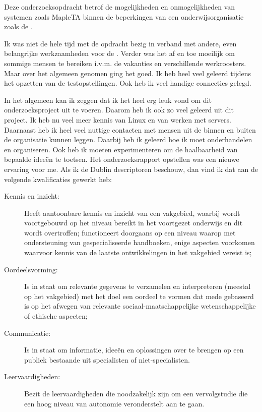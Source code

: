 
Deze onderzoeksopdracht betrof de mogelijkheden en onmogelijkheden van
systemen zoals MapleTA binnen de beperkingen van een
onderwijsorganisatie zoals de \HR{}.

Ik was niet de hele tijd met de opdracht bezig in verband met andere,
even belangrijke werkzaamheden voor de \HR{}. Verder was het af en toe
moeilijk om sommige mensen te bereiken i.v.m. de vakanties en
verschillende werkroosters. Maar over het algemeen genomen ging het
goed. Ik heb heel veel geleerd tijdens het opzetten van de
testopstellingen. Ook heb ik veel handige connecties gelegd.

In het algemeen kan ik zeggen dat ik het heel erg leuk vond om dit
onderzoeksproject uit te voeren. Daarom heb ik ook zo veel geleerd uit
dit project. Ik heb nu veel meer kennis van Linux en van werken met
servers. Daarnaast heb ik heel veel nuttige contacten met mensen uit
de binnen en buiten de organisatie kunnen leggen. Daarbij heb ik
geleerd hoe ik moet onderhandelen en organiseren. Ook heb ik moeten
experimenteren om de haalbaarheid van bepaalde ideeën te toetsen.  Het
onderzoeksrapport opstellen was een nieuwe ervaring voor me. Als ik
de Dublin descriptoren \cite{descriptors} beschouw, dan vind ik dat
aan de volgende kwalificaties gewerkt heb:

\begin{description}
\item[Kennis en inzicht:] Heeft aantoonbare kennis en inzicht van een
  vakgebied, waarbij wordt voortgebouwd op het niveau bereikt in het
  voortgezet onderwijs en dit wordt overtroffen; functioneert
  doorgaans op een niveau waarop met ondersteuning van
  gespecialiseerde handboeken, enige aspecten voorkomen waarvoor
  kennis van de laatste ontwikkelingen in het vakgebied vereist is;
\item[Oordeelsvorming:] Is in staat om relevante gegevens te
  verzamelen en interpreteren (meestal op het vakgebied) met het doel
  een oordeel te vormen dat mede gebaseerd is op het afwegen van
  relevante sociaal-maatschappelijke wetenschappelijke of ethische
  aspecten;
\item[Communicatie:] Is in staat om informatie, ideeën en oplossingen
  over te brengen op een publiek bestaande uit specialisten of
  niet-specialisten.
\item[Leervaardigheden:] Bezit de leervaardigheden die noodzakelijk
  zijn om een vervolgstudie die een hoog niveau van autonomie
  veronderstelt aan te gaan.
\end{description}


